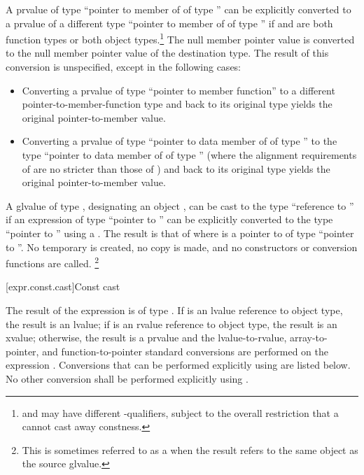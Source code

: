 \pnum
{}%
%
A prvalue of type ``pointer to member of  of type ''
can be explicitly converted to a prvalue of a different type ``pointer to member of
 of type '' if  and  are both
function types or both object types.\footnote{ and  may have
different \cv-qualifiers, subject to
the overall restriction that a  cannot cast away
constness.} The null member pointer value is converted to the
null member pointer value of the destination type. The result of this
conversion is unspecified, except in the following cases:

\begin{itemize}
\item Converting a prvalue of type ``pointer to member function'' to a
different pointer-to-member-function type and back to its original type
yields the original pointer-to-member value.

\item Converting a prvalue of type ``pointer to data member of 
of type '' to the type ``pointer to data member of 
of type '' (where the alignment requirements of  are
no stricter than those of ) and back to its original type
yields the original pointer-to-member value.
\end{itemize}

\pnum
{}%
%
A glvalue of type ,
designating an object ,
can be cast to the type ``reference to ''
if an expression of type ``pointer to ''
can be explicitly converted to the type ``pointer to ''
using a .
The result is that of 
where  is a pointer to 
of type ``pointer to ''.
No temporary is created, no copy is made, and
no constructors or conversion
functions are called.%
\footnote{This is sometimes referred to as a 
when the result refers to the same object as the source glvalue.}

[expr.const.cast]{Const cast}

\pnum
{}%
%
The result of the expression  is of type
. If  is an lvalue reference to object type, the result is an
lvalue;
if  is an rvalue reference to object type, the result is an xvalue;
otherwise, the result is a prvalue and the
lvalue-to-rvalue, array-to-pointer,
and function-to-pointer standard conversions are
performed on the expression . Conversions that can be performed explicitly using
 are listed below. No other conversion shall be
performed explicitly using .

